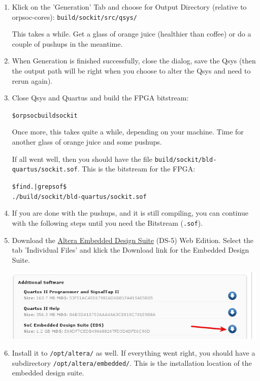 \documentclass[twoside]{article}
\begin{document}
\begin{enumerate}
\item Klick on the 'Generation' Tab and choose for Output Directory
  (relative to orpsoc-cores): \texttt{build/sockit/src/qsys/}

  This takes a while. Get a glass of orange juice (healthier than
  coffee) or do a couple of pushups in the meantime.

\item When Generation is finished successfully, close the dialog, save
  the Qsys (then the output path will be right when you choose to
  alter the Qsys and need to rerun again).

\item Close Qsys and Quartus and
  build the FPGA bitstream:
  \begin{alltt}
\$ orpsoc build sockit    
  \end{alltt}

  Once more, this takes quite a while, depending on your machine. Time
  for another glass of orange juice and some pushups.

  If all went well, then you should have the file
  \texttt{build/sockit/bld-quartus/sockit.sof}. This is the bitstream
  for the FPGA:
  \begin{alltt}
\$ find . | grep sof\$
./build/sockit/bld-quartus/sockit.sof    
  \end{alltt}

\item If you are done with the pushups, and it is still compiling, you
  can continue with the following steps until you need the Bitstream
  (\texttt{.sof}).

\item Download the
  \href{http://dl.altera.com/?edition=web#tabs-2}{Altera Embedded
    Design Suite} (DS-5) Web Edition. Select the tab 'Individual
  Files' and klick the Download link for the Embedded Design Suite.

\includegraphics[width=\textwidth]{download-eds.png}

\item Install it to \texttt{/opt/altera/} as well. If everything went
  right, you should have a subdirectory
  \texttt{/opt/altera/embedded/}. This is the installation location of
  the embedded design suite.


\end{enumerate}
\end{document}
